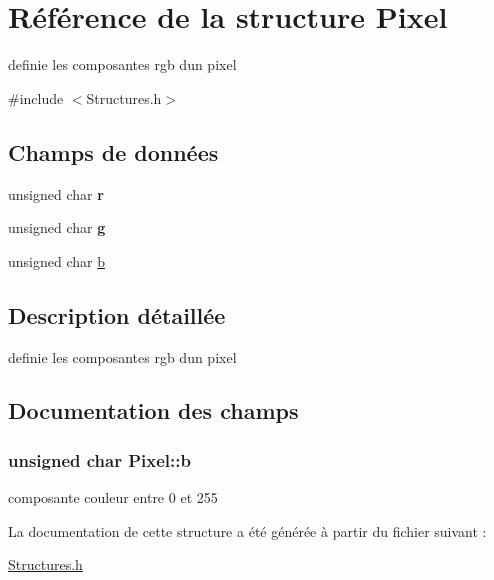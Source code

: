 \hypertarget{structPixel}{}\section{Référence de la structure Pixel}
\label{structPixel}


definie les composantes rgb d\textquotesingle{}un pixel  




{\ttfamily \#include $<$Structures.\+h$>$}

\subsection*{Champs de données}
\begin{DoxyCompactItemize}
\item 
unsigned char {\bfseries r}\hypertarget{structPixel_a038ad5b3349e7548d17c5d3bec511b94}{}\label{structPixel_a038ad5b3349e7548d17c5d3bec511b94}

\item 
unsigned char {\bfseries g}\hypertarget{structPixel_a8407845aacf1663d9463475619911686}{}\label{structPixel_a8407845aacf1663d9463475619911686}

\item 
unsigned char \hyperlink{structPixel_a760bdf29b15433d257f119239fcff4d4}{b}
\end{DoxyCompactItemize}


\subsection{Description détaillée}
definie les composantes rgb d\textquotesingle{}un pixel 

\subsection{Documentation des champs}
\subsubsection[{\texorpdfstring{b}{b}}]{\setlength{\rightskip}{0pt plus 5cm}unsigned char Pixel\+::b}\hypertarget{structPixel_a760bdf29b15433d257f119239fcff4d4}{}\label{structPixel_a760bdf29b15433d257f119239fcff4d4}
composante couleur entre 0 et 255 

La documentation de cette structure a été générée à partir du fichier suivant \+:\begin{DoxyCompactItemize}
\item 
\hyperlink{Structures_8h}{Structures.\+h}\end{DoxyCompactItemize}
